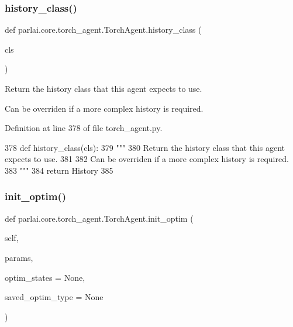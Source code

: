 \subsubsection{\texorpdfstring{history\+\_\+class()}{history\_class()}}
{\footnotesize\ttfamily def parlai.\+core.\+torch\+\_\+agent.\+Torch\+Agent.\+history\+\_\+class (\begin{DoxyParamCaption}\item[{}]{cls }\end{DoxyParamCaption})}

\begin{DoxyVerb}Return the history class that this agent expects to use.

Can be overriden if a more complex history is required.
\end{DoxyVerb}
 

Definition at line 378 of file torch\+\_\+agent.\+py.


\begin{DoxyCode}
378     \textcolor{keyword}{def }history\_class(cls):
379         \textcolor{stringliteral}{"""}
380 \textcolor{stringliteral}{        Return the history class that this agent expects to use.}
381 \textcolor{stringliteral}{}
382 \textcolor{stringliteral}{        Can be overriden if a more complex history is required.}
383 \textcolor{stringliteral}{        """}
384         \textcolor{keywordflow}{return} History
385 
\end{DoxyCode}
\mbox{\label{classparlai_1_1core_1_1torch__agent_1_1TorchAgent_a3784f1ddaa6ffad009716910f3f36dd4}} 
\subsubsection{\texorpdfstring{init\+\_\+optim()}{init\_optim()}}
{\footnotesize\ttfamily def parlai.\+core.\+torch\+\_\+agent.\+Torch\+Agent.\+init\+\_\+optim (\begin{DoxyParamCaption}\item[{}]{self,  }\item[{}]{params,  }\item[{}]{optim\+\_\+states = {\ttfamily None},  }\item[{}]{saved\+\_\+optim\+\_\+type = {\ttfamily None} }\end{DoxyParamCaption})}

